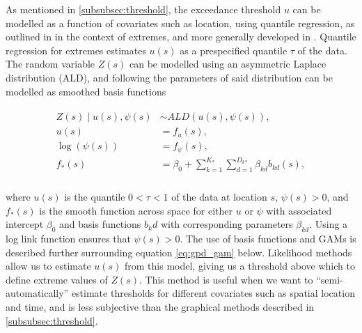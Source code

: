 \documentclass{article}
\numberwithin{equation}{section}
\begin{document}
As mentioned in \ref{subsubsec:threshold}, the exceedance threshold $u$ can be modelled as a function of covariates such as location, using quantile regression, as outlined in \cite{Youngman2019} in the context of extremes, and more generally developed in \cite{Yu2001}. 
Quantile regression for extremes estimates $u(s)$ as a prespecified quantile $\tau$ of the data. 
The random variable $Z(s)$ can be modelled using an asymmetric Laplace distribution (ALD), and following \cite{Youngman2019} the parameters of said distribution can be modelled as smoothed basis functions
\begin{center}
  \begin{align} \label{eq:asymmetric_laplace}
    \begin{split}
      Z(s) \mid u(s), \psi(s) &\sim ALD(u(s), \psi(s)), \\
      u(s) &= f_u(s), \\
      \log(\psi(s)) &= f_{\psi}(s), \\
      f_*(s) &= \beta_0 + \sum_{k = 1}^{K_*}{\sum_{d = 1}^{D_k{_*}}\beta_{kd}b_{kd}(s)}, \\
    \end{split}
  \end{align}
\end{center}
where $u(s)$ is the quantile $0 < \tau < 1$ of the data at location $s$, $\psi(s) > 0$, and $f_*(s)$ is the smooth function across space for either $u$ or $\psi$ with associated intercept $\beta_0$ and basis functions $b_kd$ with corresponding parameters $\beta_{kd}$.
Using a log link function ensures that $\psi(s) > 0$.
The use of basis functions and GAMs is described further surrounding equation \ref{eq:gpd_gam} below. 
Likelihood methods allow us to estimate $u(s)$ from this model, giving us a threshold above which to define extreme values of $Z(s)$.
This method is useful when we want to ``semi-automatically'' estimate thresholds for different covariates such as spatial location and time, and is less subjective than the graphical methods described in \ref{subsubsec:threshold}.
\end{document}
